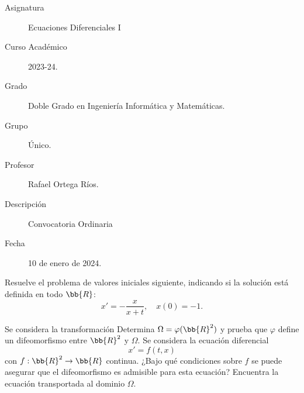 \documentclass[12pt]{article}
\begin{document}

    
    

    \begin{description}
        \item[Asignatura] Ecuaciones Diferenciales I
        \item[Curso Académico] 2023-24.
        \item[Grado] Doble Grado en Ingeniería Informática y Matemáticas.
        \item[Grupo] Único.
        \item[Profesor] Rafael Ortega Ríos.
        \item[Descripción] Convocatoria Ordinaria
        \item[Fecha] 10 de enero de 2024.
    
    \end{description}
    \newpage

\begin{ejercicio}
    Resuelve el problema de valores iniciales siguiente, indicando si la solución está definida en todo $\bb{R}$:
    \begin{equation*}
        x'= -\frac{x}{x+t}, \quad x(0)=-1.
    \end{equation*}
\end{ejercicio}

\begin{ejercicio}
    Se considera la transformación
    Determina $\Omega=\varphi(\bb{R}^2)$ y prueba que $\varphi$ define un difeomorfismo entre $\bb{R}^2$ y $\Omega$.
    Se considera la ecuación diferencial
    \begin{equation*}
        x'=f(t,x)
    \end{equation*}
    con $f:\bb{R}^2\to\bb{R}$ continua. ¿Bajo qué condiciones sobre $f$ se puede asegurar que el difeomorfismo es admisible para esta ecuación? Encuentra la ecuación transportada al dominio $\Omega$.
\end{ejercicio}
\end{document}
